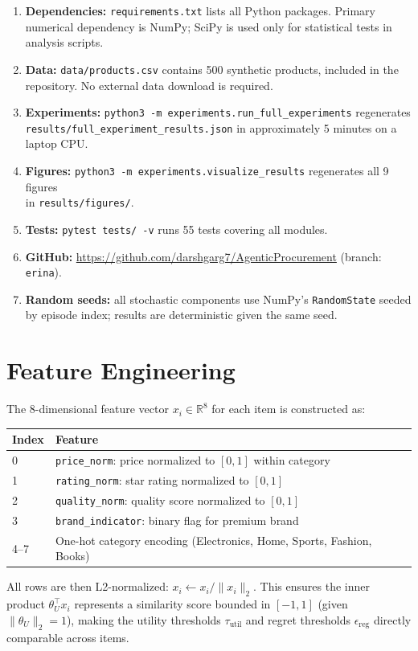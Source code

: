\documentclass[11pt,letterpaper]{article}
\newcommand{\thetaU}{\theta_U}
\newcommand{\epsreg}{\epsilon_{\mathrm{reg}}}
\begin{document}
\begin{enumerate}
    \item \textbf{Dependencies:} \texttt{requirements.txt} lists all Python packages.  Primary numerical dependency is NumPy; SciPy is used only for statistical tests in analysis scripts.
    \item \textbf{Data:} \texttt{data/products.csv} contains 500 synthetic products, included in the repository.  No external data download is required.
    \item \textbf{Experiments:} \texttt{python3 -m experiments.run\_full\_experiments} regenerates\\ \texttt{results/full\_experiment\_results.json} in approximately 5 minutes on a laptop CPU.
    \item \textbf{Figures:} \texttt{python3 -m experiments.visualize\_results} regenerates all 9 figures\\ in \texttt{results/figures/}.
    \item \textbf{Tests:} \texttt{pytest tests/ -v} runs 55 tests covering all modules.
    \item \textbf{GitHub:} \url{https://github.com/darshgarg7/AgenticProcurement} (branch: \texttt{erina}).
    \item \textbf{Random seeds:} all stochastic components use NumPy's \texttt{RandomState} seeded by episode index; results are deterministic given the same seed.
\end{enumerate}

\section{Feature Engineering}
\label{app:features}

The 8-dimensional feature vector $x_i \in \mathbb{R}^8$ for each item is constructed as:
\begin{center}
\begin{tabular}{ll}
\toprule
Index & Feature \\
\midrule
0 & \texttt{price\_norm}: price normalized to $[0,1]$ within category \\
1 & \texttt{rating\_norm}: star rating normalized to $[0,1]$ \\
2 & \texttt{quality\_norm}: quality score normalized to $[0,1]$ \\
3 & \texttt{brand\_indicator}: binary flag for premium brand \\
4--7 & One-hot category encoding (Electronics, Home, Sports, Fashion, Books) \\
\bottomrule
\end{tabular}
\end{center}
All rows are then L2-normalized: $x_i \leftarrow x_i / \|x_i\|_2$.  This ensures the inner product $\thetaU^\top x_i$ represents a similarity score bounded in $[-1, 1]$ (given $\|\thetaU\|_2 = 1$), making the utility thresholds $\tau_{\mathrm{util}}$ and regret thresholds $\epsreg$ directly comparable across items.
\end{document}
